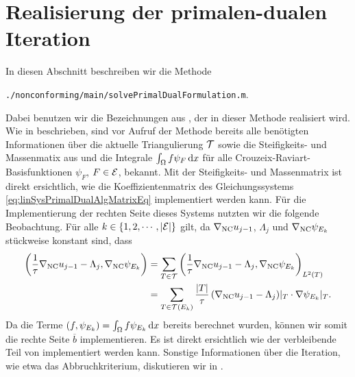 \section{Realisierung der primalen-dualen Iteration}
\label{sec:implementationPrimalDualIteration}
In diesen Abschnitt beschreiben wir die Methode
\begin{center}
  \texttt{./nonconforming/main/solvePrimalDualFormulation.m}.
\end{center}
Dabei benutzen wir die Bezeichnungen aus , der
in dieser Methode realisiert wird.
Wie in  beschrieben, sind vor Aufruf der Methode bereits
alle benötigten Informationen über die aktuelle Triangulierung $\mathcal{T}$
sowie die Steifig\-keits- und Massenmatix aus 
und die Integrale $\int_\Omega f\psi_F\,\mathrm{d}x$ für alle
Crouzeix-Raviart-Basisfunktionen $\psi_F$, $F\in\mathcal{E}$, bekannt.
Mit der Steifigkeits- und Massenmatrix ist direkt ersichtlich, 
wie die Koeffizientenmatrix des Gleichungssystems
\eqref{eq:linSysPrimalDualAlgMatrixEq} implementiert werden kann.
Für die Implementierung der rechten Seite dieses Systems nutzten wir die
folgende Beobachtung.
Für alle $k\in\{1,2,\cdots,|\mathcal{E}|\}$ gilt, da $\nabla_\textup{NC} u_{j-1}$,
$\Lambda_j$ und $\nabla_\textup{NC} \psi_{E_k}$ stückweise konstant sind, dass
\begin{align*}
  \left(\frac{1}{\tau}\nabla_\textup{NC} u_{j-1}-\Lambda_j,\nabla_\textup{NC}\psi_{E_k}\right)
  &=
  \sum_{T\in\mathcal{T}}
  \left(\frac{1}{\tau}\nabla_\textup{NC} u_{j-1}-\Lambda_j,
  \nabla_\textup{NC}\psi_{E_k}\right)_{L^2(T)}\\
  &=
  \sum_{T\in\mathcal{T}(E_k)}
  \frac{|T|}{\tau}\left(\nabla_\textup{NC} u_{j-1}-\Lambda_j\right)\!|_T\cdot
  \nabla\psi_{E_k}|_T.
\end{align*}
Da die Terme $\left(f,\psi_{E_k}\right)=\int_\Omega f\psi_{E_k}\,\mathrm{d}x$ bereits
berechnet wurden, können wir somit die rechte Seite $\overline b$
implementieren.
Es ist direkt ersichtlich wie der verbleibende Teil von
 implementiert werden kann.
Sonstige Informationen über die Iteration, wie etwa das Abbruchkriterium,
diskutieren wir in . 

